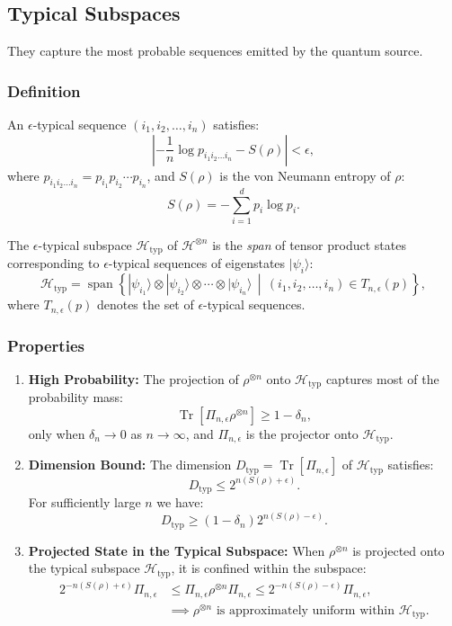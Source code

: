 \subsection{Typical Subspaces}
They capture the most probable sequences emitted by the quantum source.

\subsubsection{Definition}

An \(\epsilon\)-typical sequence \((i_1, i_2, \dots, i_n)\) satisfies:
\[
\left| -\frac{1}{n} \log p_{i_1 i_2 \dots i_n} - S(\rho) \right| < \epsilon,
\]
where \(p_{i_1 i_2 \dots i_n} = p_{i_1} p_{i_2} \cdots p_{i_n}\), and \(S(\rho)\) is the von Neumann entropy of \(\rho\):
\[
S(\rho) = - \sum_{i=1}^d p_i \log p_i.
\]

The \(\epsilon\)-typical subspace \(\mathcal{H}_{\text{typ}}\) of \(\mathcal{H}^{\otimes n}\) is the \textit{span} of tensor product states corresponding to \(\epsilon\)-typical sequences of eigenstates \(|\psi_i\rangle\):
\[
\mathcal{H}_{\text{typ}} = \operatorname{span}\left\{ |\psi_{i_1}\rangle \otimes |\psi_{i_2}\rangle \otimes \cdots \otimes |\psi_{i_n}\rangle \, \middle| \, (i_1, i_2, \dots, i_n) \in T_{n, \epsilon}(p) \right\},
\]
where \(T_{n, \epsilon}(p)\) denotes the set of \(\epsilon\)-typical sequences.

\subsubsection{Properties}

\begin{enumerate}
    \item \textbf{High Probability:} The projection of \(\rho^{\otimes n}\) onto \(\mathcal{H}_{\text{typ}}\) captures most of the probability mass:
    \[
    \operatorname{Tr}[\Pi_{n, \epsilon} \rho^{\otimes n}] \geq 1 - \delta_n,
    \]
    only when \(\delta_n \to 0\) as \(n \to \infty\), and \(\Pi_{n, \epsilon}\) is the projector onto \(\mathcal{H}_{\text{typ}}\).

    \item \textbf{Dimension Bound:} The dimension \(D_{\text{typ}} = \operatorname{Tr}[\Pi_{n, \epsilon}]\) of \(\mathcal{H}_{\text{typ}}\) satisfies:
    \[
    D_{\text{typ}} \leq 2^{n(S(\rho) + \epsilon)}.
    \]
    For sufficiently large \(n\) we have:
    \[
    D_{\text{typ}} \geq (1 - \delta_n) 2^{n(S(\rho) - \epsilon)}.
    \]

\item \textbf{Projected State in the Typical Subspace:} 
When $\rho^{\otimes n}$ is projected onto the typical subspace $\mathcal{H}_{\text{typ}}$, it is confined within the subspace: 
\[
\begin{aligned}
    2^{-n(S(\rho) + \epsilon)} \Pi_{n, \epsilon} &\leq \Pi_{n, \epsilon} \rho^{\otimes n} \Pi_{n, \epsilon} \leq 2^{-n(S(\rho) - \epsilon)} \Pi_{n, \epsilon}, \\
    &\implies \rho^{\otimes n} \text{ is approximately uniform within } \mathcal{H}_{\text{typ}}.
\end{aligned}
\]

\end{enumerate}

